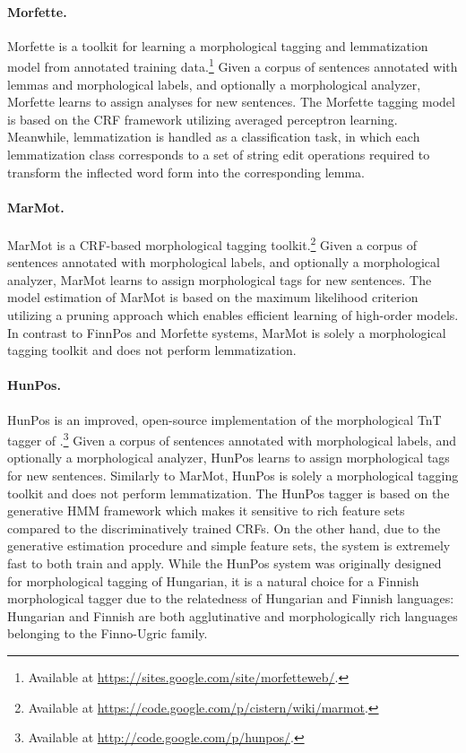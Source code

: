 \documentclass[smallextended]{svjour3}       %
\begin{document}
\paragraph{Morfette.}

Morfette is a toolkit for learning a morphological tagging and lemmatization model from annotated training data.\footnote{Available at \url{https://sites.google.com/site/morfetteweb/}.} Given a corpus of sentences annotated with lemmas and morphological labels, and optionally a morphological analyzer, Morfette learns to assign analyses for new sentences. The Morfette tagging model is based on the CRF framework utilizing averaged perceptron learning. Meanwhile, lemmatization is handled as a classification task, in which each lemmatization class corresponds to a set of string edit operations required to transform the inflected word form into the corresponding lemma.

\paragraph{MarMot.}

MarMot is a CRF-based morphological tagging toolkit.\footnote{Available at \url{https://code.google.com/p/cistern/wiki/marmot}.} Given a corpus of sentences annotated with morphological labels, and optionally a morphological analyzer, MarMot learns to assign morphological tags for new sentences. The model estimation of MarMot is based on the maximum likelihood criterion utilizing a pruning approach which enables efficient learning of high-order models. In contrast to FinnPos and Morfette systems, MarMot is solely a morphological tagging toolkit and does not perform lemmatization. %

\paragraph{HunPos.}

HunPos is an improved, open-source implementation of the morphological TnT tagger of \citet{brants2000}.\footnote{Available at \url{http://code.google.com/p/hunpos/}.} Given a corpus of sentences annotated with morphological labels, and optionally a morphological analyzer, HunPos learns to assign morphological tags for new sentences. Similarly to MarMot, HunPos is solely a morphological tagging toolkit and does not perform lemmatization. 
The HunPos tagger is based on the generative HMM framework which makes it sensitive to rich feature sets compared to the discriminatively trained CRFs. On the other hand, due to the generative estimation procedure and simple feature sets, the system is extremely fast to both train and apply. While the HunPos system was originally designed for morphological tagging of Hungarian, it is a natural choice for a Finnish morphological tagger due to the relatedness of Hungarian and Finnish languages: Hungarian and Finnish are both agglutinative and morphologically rich languages belonging to the Finno-Ugric family. %
\end{document}
